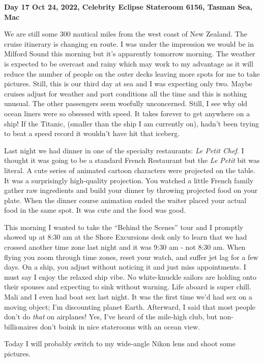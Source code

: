 \textbf{Day 17 Oct 24, 2022, Celebrity Eclipse Stateroom 6156, Tasman Sea, Mac}

We are still some 300 nautical miles from the west coast of New Zealand.
The cruise itinerary is changing en route. I was under the impression we
would be in Milford Sound this morning but it's apparently tomorrow
morning. The weather is expected to be overcast and rainy which may work
to my advantage as it will reduce the number of people on the outer
decks leaving more spots for me to take pictures. Still, this is our
third day at sea and I was expecting only two. Maybe cruises adjust for
weather and port conditions all the time and this is nothing unusual.
The other passengers seem woefully unconcerned. Still, I see why old
ocean liners were so obsessed with speed. It takes forever to get
anywhere on a ship! If the Titanic, (smaller than the ship I am
currently on), hadn't been trying to beat a speed record it wouldn't
have hit that iceberg.

Last night we had dinner in one of the specialty restaurants: \emph{Le
Petit Chef}. I thought it was going to be a standard French Restaurant
but the \emph{Le Petit} bit was literal. A cute series of animated
cartoon characters were projected on the table. It was a surprisingly
high-quality projection. You watched a little French family gather raw
ingredients and build your dinner by throwing projected food on your
plate. When the dinner course animation ended the waiter placed your
actual food in the same spot. It was cute and the food was good.

This morning I wanted to take the ``Behind the Scenes'' tour and I
promptly showed up at 8:30 am at the Shore Excursions desk only to learn
that we had crossed another time zone last night and it was 9:30 am -
not 8:30 am. When flying you zoom through time zones, reset your watch,
and suffer jet lag for a few days. On a ship, you adjust without
noticing it and just miss appointments. I must say I enjoy the relaxed
ship vibe. No white-knuckle sailors are holding onto their spouses and
expecting to sink without warning. Life aboard is super chill. Mali and
I even had boat sex last night. It was the first time we'd had sex on a
moving object; I'm discounting planet Earth. Afterward, I said that most
people don't do \emph{that} on airplanes! Yes, I've heard of the
mile-high club, but non-billionaires don't boink in nice staterooms with
an ocean view.

Today I will probably switch to my wide-angle Nikon lens and shoot some
pictures.


